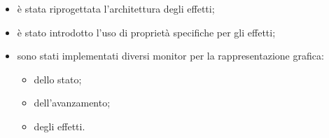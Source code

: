\documentclass[%
]{beamer}
\begin{document}
            \begin{frame}
                \frametitle{\insertsection}
                \framesubtitle{\insertsubsection}
                \begin{columns}[onlytextwidth]
                    \begin{column}{.4\textwidth}
                    \begin{itemize}
                        \item<1->
                            è stata riprogettata l'architettura degli effetti;
                        \item<2->
                            è stato introdotto l'uso di proprietà specifiche per gli effetti;
                        \item<3->
                            sono stati implementati diversi monitor per la rappresentazione grafica:
                            \begin{itemize}
                              \item<4->
                                  dello stato;
                              \item<5->
                                  dell'avanzamento;
                              \item<6->
                                  degli effetti.
                            \end{itemize}
                    \end{itemize}
                    \end{column}
                    \begin{column}{.6\textwidth}
                        \centering
                    \end{column}
                \end{columns}
            \end{frame}
\end{document}
